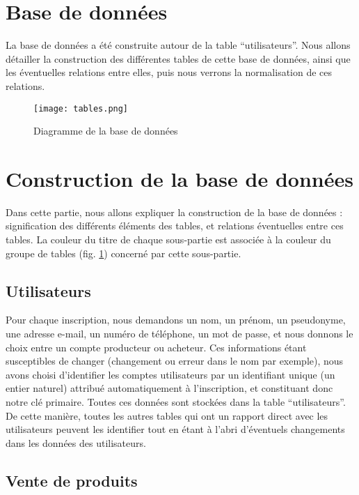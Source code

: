 \documentclass{article}
\begin{document}
\section*{Base de données}

La base de données a été construite autour de la table “utilisateurs”. Nous allons détailler la construction des différentes tables de cette base de données, ainsi que les éventuelles relations entre elles, puis nous verrons la normalisation de ces relations.

\begin{figure}[!h]
\centering
\texttt{[image: tables.png]}
\caption{\label{fig:tables}Diagramme de la base de données}
\end{figure}

\section{Construction de la base de données}

Dans cette partie, nous allons expliquer la construction de la base de données : signification des différents éléments des tables, et relations éventuelles entre ces tables. La couleur du titre de chaque sous-partie est associée à la couleur du groupe de tables (fig. \ref{fig:tables}) concerné par cette sous-partie.

\subsection{\color{cyan}Utilisateurs}

Pour chaque inscription, nous demandons un nom, un prénom, un pseudonyme, une adresse e-mail, un numéro de téléphone, un mot de passe, et nous donnons le choix entre un compte producteur ou acheteur. Ces informations étant susceptibles de changer (changement ou erreur dans le nom par exemple), nous avons choisi d’identifier les comptes utilisateurs par un identifiant unique (un entier naturel) attribué automatiquement à l’inscription, et constituant donc notre clé primaire. Toutes ces données sont stockées dans la table “utilisateurs”. De cette manière, toutes les autres tables qui ont un rapport direct avec les utilisateurs peuvent les identifier tout en étant à l’abri d’éventuels changements dans les données des utilisateurs.

\subsection{\color{lime}Vente de produits}
\end{document}

